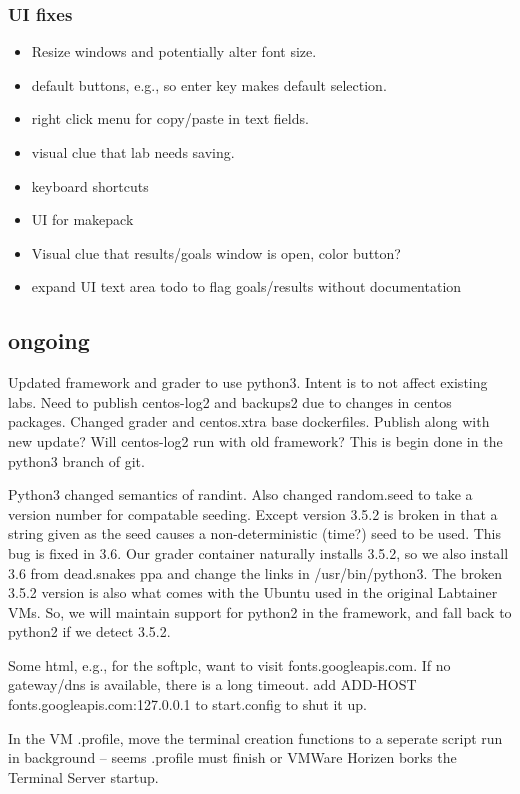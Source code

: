 \documentclass[12pt]{article}
\begin{document}
\subsubsection{UI fixes}
\begin{itemize}
\item Resize windows and potentially alter font size.
\item default buttons, e.g., so enter key makes default selection.
\item right click menu for copy/paste in text fields.
\item visual clue that lab needs saving.
\item keyboard shortcuts
\item UI for makepack
\item Visual clue that results/goals window is open, color button?
\item expand UI text area todo to flag goals/results without documentation
\end{itemize}

\subsection{ongoing}
Updated framework and grader to use python3.  Intent is to not affect existing labs.  Need to publish centos-log2 and
backups2 due to changes in centos packages.  Changed grader and centos.xtra base dockerfiles.
Publish along with new update?   Will centos-log2 run with old framework?
This is begin done in the python3 branch of git.

Python3 changed semantics of randint.  Also changed random.seed to take a version number for compatable seeding.
Except version 3.5.2 is broken in that a string given as the seed causes a non-deterministic (time?) seed to be used.
This bug is fixed in 3.6.  Our grader container naturally installs 3.5.2, so we also install 3.6 from dead.snakes ppa
and change the links in /usr/bin/python3. The broken 3.5.2 version is also what comes with the Ubuntu used in the original
Labtainer VMs.  So, we will maintain support for python2 in the framework, and fall back to python2 if we detect 3.5.2.

Some html, e.g., for the softplc, want to visit fonts.googleapis.com.  If no gateway/dns is available, there is a long timeout.
add         ADD-HOST fonts.googleapis.com:127.0.0.1 to start.config to shut it up.

In the VM .profile, move the terminal creation functions to a seperate script run in background -- seems .profile must finish or VMWare Horizen 
borks the Terminal Server startup.
\end{document}
